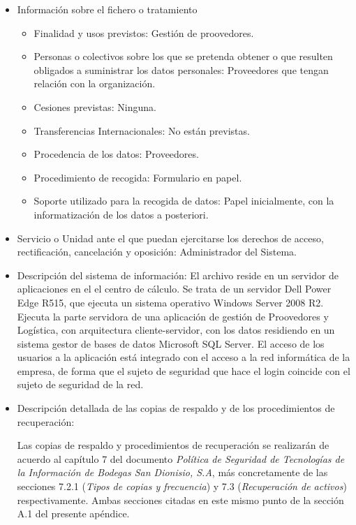 \documentclass[a4paper,11pt,bibtotoc,noliststotoc]{scrbook}
\begin{document}
\begin{itemize}
\item Información sobre el fichero o tratamiento
	\begin{itemize}
	\item Finalidad y usos previstos: Gestión de proovedores.
	\item Personas o colectivos sobre los que se pretenda obtener o que resulten obligados a suministrar los datos personales: Proveedores que tengan relación con la organización.
	\item Cesiones previstas: Ninguna.
	\item Transferencias Internacionales: No están previstas.
	\item Procedencia de los datos: Proveedores.
	\item Procedimiento de recogida: Formulario en papel.
	\item Soporte utilizado para la recogida de datos: Papel inicialmente, con la informatización de los datos a posteriori.
	\end{itemize}

\item Servicio o Unidad ante el que puedan ejercitarse los derechos de acceso, rectificación, cancelación y oposición: Administrador del Sistema.

\item Descripción del sistema de información: El archivo reside en un servidor de aplicaciones en el el centro de cálculo. Se trata de un servidor Dell Power Edge R515, que ejecuta un sistema operativo Windows Server 2008 R2. Ejecuta la parte servidora de una aplicación de gestión de Proovedores y Logística, con arquitectura cliente-servidor, con los datos residiendo en un sistema gestor de bases de datos Microsoft SQL Server. El acceso de los usuarios a la aplicación está integrado con el acceso a la red informática de la empresa, de forma que el sujeto de seguridad que hace el login coincide con el sujeto de seguridad de la red.

\item Descripción detallada de las copias de respaldo y de los procedimientos de recuperación:

Las copias de respaldo y procedimientos de recuperación se realizarán de acuerdo al capítulo 7 del documento \emph{Política de Seguridad de Tecnologías de la Información de Bodegas San Dionisio, S.A}, más concretamente de las secciones 7.2.1 (\emph{Tipos de copias y frecuencia}) y 7.3 (\emph{Recuperación de activos}) respectivamente. Ambas secciones citadas en este mismo punto de la sección A.1 del presente apéndice.


\end{itemize}
\end{document}
